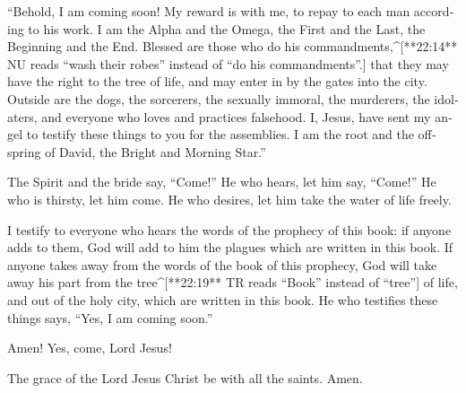 \begin{paracols}{2}
\begin{english}
 “Behold, I am coming soon! My reward is with me, to repay to each man according to his work.  I am the Alpha and the Omega, the First and the Last, the Beginning and the End.  Blessed are those who do his commandments,^[**22:14** NU reads “wash their robes” instead of “do his commandments”.] that they may have the right to the tree of life, and may enter in by the gates into the city.  Outside are the dogs, the sorcerers, the sexually immoral, the murderers, the idolaters, and everyone who loves and practices falsehood.  I, Jesus, have sent my angel to testify these things to you for the assemblies. I am the root and the offspring of David, the Bright and Morning Star.” 

 The Spirit and the bride say, “Come!” He who hears, let him say, “Come!” He who is thirsty, let him come. He who desires, let him take the water of life freely. 

 I testify to everyone who hears the words of the prophecy of this book: if anyone adds to them, God will add to him the plagues which are written in this book.  If anyone takes away from the words of the book of this prophecy, God will take away his part from the tree^[**22:19** TR reads “Book” instead of “tree”] of life, and out of the holy city, which are written in this book.  He who testifies these things says, “Yes, I am coming soon.” 

Amen! Yes, come, Lord Jesus! 

 The grace of the Lord Jesus Christ be with all the saints. Amen.
\end{english}
\end{paracols}
